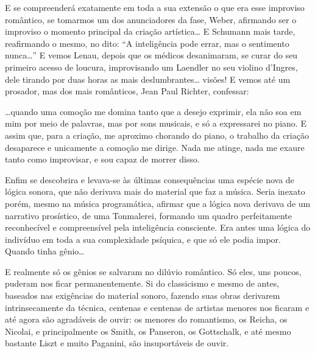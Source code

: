 E se compreenderá exatamente em toda a sua extensão o que era esse
improviso romântico, se tomarmos um dos anunciadores da fase, Weber,
afirmando ser o improviso o momento principal da criação artística\ldots{} E
Schumann mais tarde, reafirmando o mesmo, no dito: ``A inteligência pode
errar, mas o sentimento nunca\ldots{}'' E vemos Lenau, depois que os médicos
desanimaram, se curar do seu primeiro acesso de loucura, improvisando um
Laendler no seu violino d'Ingres, dele tirando por duas horas as mais
deslumbrantes\ldots{} visões! E vemos até um prosador, mas dos mais
românticos, Jean Paul Richter, confessar:

\ldots{}quando uma comoção me domina tanto que a desejo exprimir, ela não soa
em mim por meio de palavras, mas por sons musicais, e só a expressarei
no piano. E assim que, para a criação, me aproximo chorando do piano, o
trabalho da criação desaparece e unicamente a comoção me dirige. Nada me
atinge, nada me exaure tanto como improvisar, e sou capaz de morrer
disso.

Enfim se descobrira e levava-se às últimas consequências uma espécie
nova de lógica sonora, que não derivava mais do material que faz a
música. Seria inexato porém, mesmo na música programática, afirmar que a
lógica nova derivava de um narrativo prosístico, de uma Tonmalerei,
formando um quadro perfeitamente reconhecível e compreensível pela
inteligência consciente. Era antes uma lógica do indivíduo em toda a sua
complexidade psíquica, e que só ele podia impor. Quando tinha gênio\ldots{}

E realmente só os gênios se salvaram no dilúvio romântico. Só eles, uns
poucos, puderam nos ficar permanentemente. Si do classicismo e mesmo de
antes, baseados nas exigências do material sonoro, fazendo suas obras
derivarem intrinsecamente da técnica, centenas e centenas de artistas
menores nos ficaram e até agora são agradáveis de ouvir: os menores do
romantismo, os Reicha, os Nicolai, e principalmente os Smith, os
Panseron, os Gottschalk, e até mesmo bastante Liszt e muito Paganini,
são insuportáveis de ouvir.

